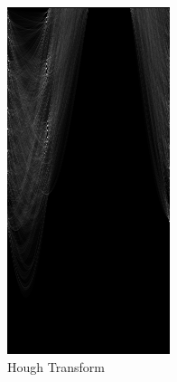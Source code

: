 \begin{figure}[H]
\begin{minipage}{0.4\textwidth}
    \includegraphics[width=\textwidth]{images/08-example-hough.png}
    \caption{Hough Transform}
    \label{fig:08-hough}

\end{minipage}
\end{figure}
